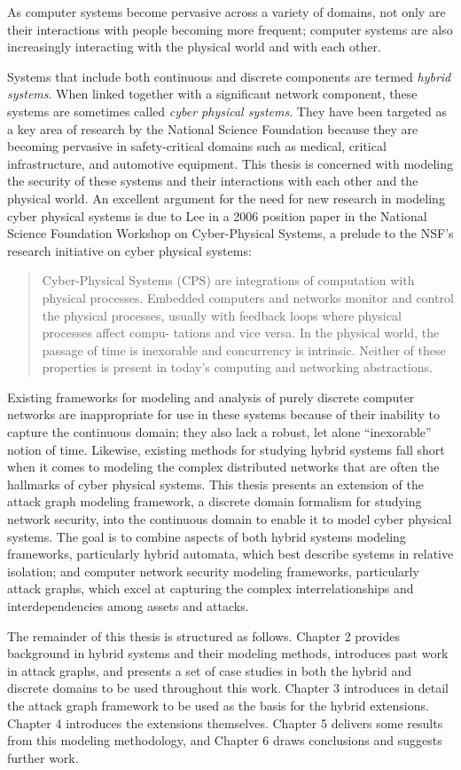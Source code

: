 As computer systems become pervasive across a variety of domains, not only are their interactions
with people becoming more frequent; computer systems are also increasingly interacting with the 
physical world and with each other.

Systems that include both continuous and discrete components are termed \emph{hybrid systems}.
When linked together with a significant network component, these systems are sometimes called
\emph{cyber physical systems}. They have been targeted as a key area of research by the National
Science Foundation because they
are becoming pervasive in safety-critical domains such as medical, critical infrastructure, and
automotive equipment. This thesis is concerned with modeling the security of these systems and
their interactions with each other and the physical world.
An excellent argument for the need for new research in modeling cyber physical systems
is due to Lee in a 2006 position paper in the National Science Foundation Workshop on Cyber-Physical Systems,
a prelude to the NSF's research initiative on cyber physical systems:
\begin{quote}
Cyber-Physical Systems (CPS) are integrations of computation with physical
processes. Embedded computers and networks monitor and control the physical
processes, usually with feedback loops where physical processes affect compu-
tations and vice versa. In the physical world, the passage of time is inexorable
and concurrency is intrinsic. Neither of these properties is present in today's
computing and networking abstractions. ~\cite{lee2006cyber}
\end{quote}

Existing frameworks for modeling and analysis of purely discrete computer networks are inappropriate for use in
these systems because of their inability to capture the continuous domain; they
also lack a robust, let alone ``inexorable'' notion of time. Likewise, existing
methods for studying hybrid systems fall short when it comes to modeling the complex distributed
networks that are often the hallmarks of cyber physical systems.
This thesis presents an extension of the attack graph modeling framework, 
a discrete domain formalism for studying network security, into the 
continuous domain to enable it to model cyber
physical systems. The goal is to combine aspects of both hybrid systems
modeling frameworks, particularly hybrid automata, which best describe systems in 
relative isolation; and computer network security modeling frameworks, particularly attack graphs,
which excel at capturing the complex interrelationships and interdependencies among assets and
attacks.

The remainder of this thesis is structured as follows. Chapter 2 provides background in hybrid systems
and their modeling methods, introduces past work in attack graphs, and presents a set of case studies
in both the hybrid and discrete domains to be used throughout this work. Chapter 3 introduces in detail
the attack graph framework to be used as the basis for the hybrid extensions. Chapter 4
introduces the extensions themselves. Chapter 5 delivers some results from this modeling methodology,
and Chapter 6 draws conclusions and suggests further work.